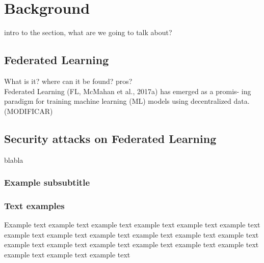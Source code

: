 \section{Background}
intro to the section, what are we going to talk about?
\subsection{Federated Learning}
What is it? where can it be found? pros?\\
\newline
Federated Learning (FL, McMahan et al., 2017a) has emerged as a promis- ing paradigm for training machine learning (ML) models using decentralized data.(MODIFICAR)\\





\subsection{Security attacks on Federated Learning}
blabla

\subsubsection{Example subsubtitle}


\subsubsection{Text examples}
Example text example text example text example text example text example text example text
example text example text example text example text example text example text example text
example text example text example text example text example text example text example text


\pagebreak